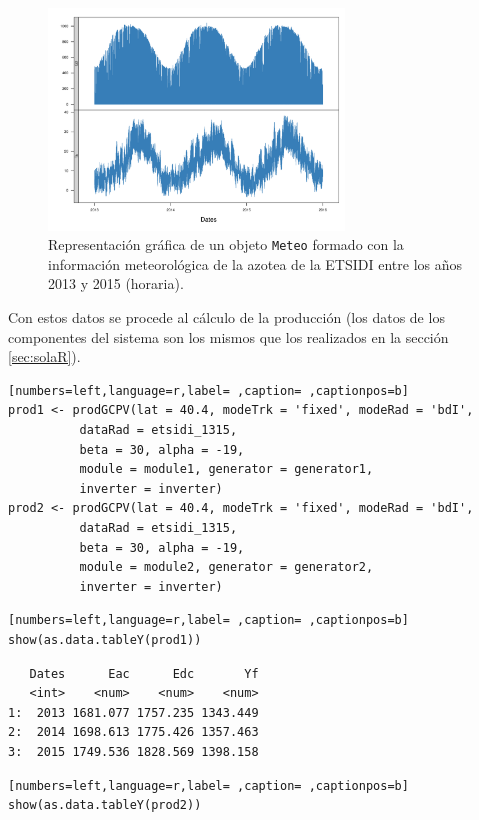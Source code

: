 \begin{figure}[htbp]
\centering
\includegraphics[width=0.7\textwidth]{figuras/ejemplos3.pdf}
\caption{Representación gráfica de un objeto \texttt{Meteo} formado con la información meteorológica de la azotea de la ETSIDI entre los años 2013 y 2015 (horaria).}
\end{figure}
Con estos datos se procede al cálculo de la producción (los datos de los componentes del sistema son los mismos que los realizados en la sección \ref{sec:solaR}).

\begin{lstlisting}[numbers=left,language=r,label= ,caption= ,captionpos=b]
prod1 <- prodGCPV(lat = 40.4, modeTrk = 'fixed', modeRad = 'bdI',
		  dataRad = etsidi_1315,
		  beta = 30, alpha = -19, 
		  module = module1, generator = generator1,
		  inverter = inverter)
prod2 <- prodGCPV(lat = 40.4, modeTrk = 'fixed', modeRad = 'bdI',
		  dataRad = etsidi_1315,
		  beta = 30, alpha = -19, 
		  module = module2, generator = generator2,
		  inverter = inverter)
\end{lstlisting}

\begin{lstlisting}[numbers=left,language=r,label= ,caption= ,captionpos=b]
show(as.data.tableY(prod1))
\end{lstlisting}

\begin{verbatim}
   Dates      Eac      Edc       Yf
   <int>    <num>    <num>    <num>
1:  2013 1681.077 1757.235 1343.449
2:  2014 1698.613 1775.426 1357.463
3:  2015 1749.536 1828.569 1398.158
\end{verbatim}


\begin{lstlisting}[numbers=left,language=r,label= ,caption= ,captionpos=b]
show(as.data.tableY(prod2))
\end{lstlisting}

